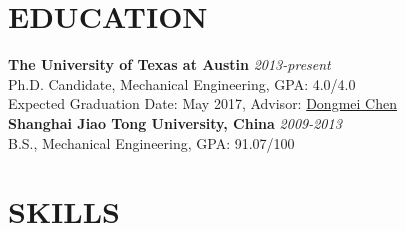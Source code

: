 \documentclass[margin, 9pt]{res} %
\begin{document}
\begin{resume}


\vspace*{-5pt}




\vspace*{-10pt}
\section{EDUCATION}

\textbf{The University of Texas at Austin} \hfill\textit{2013-present}\\
Ph.D. Candidate, Mechanical Engineering, GPA: 4.0/4.0\\
Expected Graduation Date: May 2017,  Advisor: \href{http://www.me.utexas.edu/~apscl/people.html}{Dongmei Chen}\\

\vspace*{-10pt}
\textbf{Shanghai Jiao Tong University, China} \hfill\textit{2009-2013}\\
B.S., Mechanical Engineering, GPA: 91.07/100\\

\vspace*{-10pt}
\section{SKILLS}


\end{resume}
\end{document}

